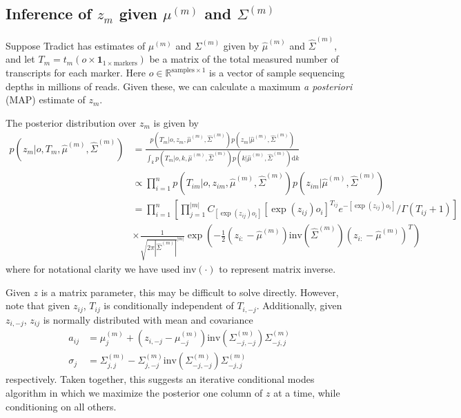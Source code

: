 \documentclass[10pt]{article}
\begin{document}
\subsection{Inference of $z_m$ given $\mu^{(m)}$ and $\Sigma^{(m)}$}

Suppose Tradict has estimates of $\mu^{(m)}$ and $\Sigma^{(m)}$ given by $\hat{\mu}^{(m)}$ and $\hat{\Sigma}^{(m)}$, and let $T_m = t_m(o \times \textbf{1}_{1 \times \textrm{markers}} )$ be a matrix of the total measured number of transcripts for each marker. Here $o \in \mathbb{R}^{\textrm{samples} \times 1}$ is a vector of sample sequencing depths in millions of reads. Given these, we can calculate a maximum \emph{a posteriori} (MAP) estimate of $z_m$. 

The posterior distribution over $z_m$ is given by 
\begin{align*}
p(z_m| o, T_m, \hat{\mu}^{(m)}, \hat{\Sigma}^{(m)}) & =  \frac{p(T_m | o, z_m, \hat{\mu}^{(m)}, \hat{\Sigma}^{(m)}) p(z_m| \hat{\mu}^{(m)}, \hat{\Sigma}^{(m)}) }{ \int_k  p(T_m | o, k, \hat{\mu}^{(m)}, \hat{\Sigma}^{(m)}) p(k | \hat{\mu}^{(m)}, \hat{\Sigma}^{(m)}) \textrm{d}k } \\
& \propto \prod_{i=1}^{n}  p(T_{im} | o, z_{im}, \hat{\mu}^{(m)}, \hat{\Sigma}^{(m)}) p(z_{im}| \hat{\mu}^{(m)}, \hat{\Sigma}^{(m)}) \\
& = \prod_{i=1}^{n} \left[ \prod_{j=1}^{|m|} C_{[\exp(z_{ij})o_i]} [\exp(z_{ij})o_i]^{T_{ij}}  e^{-[\exp(z_{ij})o_i]} / \Gamma(T_{ij} + 1) \right] \\ 
& \times \frac{1}{\sqrt{2\pi|\hat{\Sigma}^{(m)}|}^{|m|}}\exp\left(-\frac{1}{2}(z_{i:}-\hat{\mu}^{(m)}) \textrm{inv}\left( \hat{\Sigma}^{(m)} \right)(z_{i:}-\hat{\mu}^{(m)})^T \right)
\end{align*}
where for notational clarity we have used $\textrm{inv}(\cdot)$ to represent matrix inverse. 

Given $z$ is a matrix parameter, this may be difficult to solve directly. However, note that given $z_{ij}$, $T_{ij}$ is conditionally independent of $T_{i,-j}$. Additionally, given $z_{i,-j}$, $z_{ij}$ is normally distributed with mean and covariance 
\begin{align*}
a_{ij} & = \mu^{(m)}_j + \left(z_{i,-j} - \mu^{(m)}_{-j} \right)\textrm{inv}\left( \Sigma^{(m)}_{-j,-j} \right) \Sigma^{(m)}_{-j,j} \\
\sigma_j &= \Sigma^{(m)}_{j,j} - \Sigma^{(m)}_{j,-j}\textrm{inv}\left( \Sigma^{(m)}_{-j,-j} \right) \Sigma^{(m)}_{-j,j}
\end{align*}
respectively. Taken together, this suggests an iterative conditional modes algorithm in which we maximize the posterior one column of $z$ at a time, while conditioning on all others. 
\end{document}
